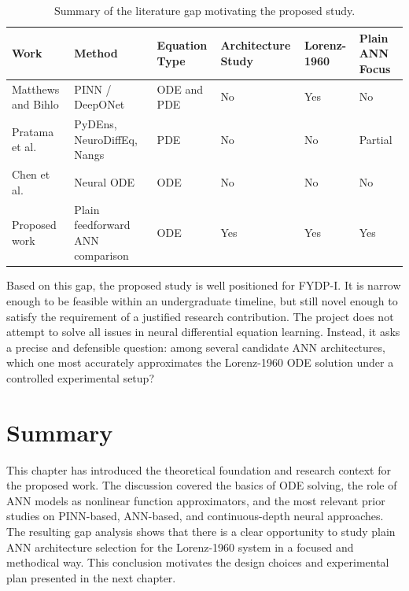 \begin{table}[htbp]
\centering
\caption{Summary of the literature gap motivating the proposed study.}
\begin{tabular}{|p{3.0cm}|p{2.3cm}|p{1.6cm}|p{1.9cm}|p{1.7cm}|p{1.7cm}|}
\hline
\textbf{Work} & \textbf{Method} & \textbf{Equation Type} & \textbf{Architecture Study} & \textbf{Lorenz-1960} & \textbf{Plain ANN Focus} \\
\hline
Matthews and Bihlo \cite{matthews2025pinnde} & PINN / DeepONet & ODE and PDE & No & Yes & No \\
\hline
Pratama et al. \cite{pratama2022ann} & PyDEns, NeuroDiffEq, Nangs & PDE & No & No & Partial \\
\hline
Chen et al. \cite{chen2019neural} & Neural ODE & ODE & No & No & No \\
\hline
Proposed work & Plain feedforward ANN comparison & ODE & Yes & Yes & Yes \\
\hline
\end{tabular}
\end{table}

Based on this gap, the proposed study is well positioned for FYDP-I. It is narrow enough to be feasible within an undergraduate timeline, but still novel enough to satisfy the requirement of a justified research contribution. The project does not attempt to solve all issues in neural differential equation learning. Instead, it asks a precise and defensible question: among several candidate ANN architectures, which one most accurately approximates the Lorenz-1960 ODE solution under a controlled experimental setup?

\section{Summary}
This chapter has introduced the theoretical foundation and research context for the proposed work. The discussion covered the basics of ODE solving, the role of ANN models as nonlinear function approximators, and the most relevant prior studies on PINN-based, ANN-based, and continuous-depth neural approaches. The resulting gap analysis shows that there is a clear opportunity to study plain ANN architecture selection for the Lorenz-1960 system in a focused and methodical way. This conclusion motivates the design choices and experimental plan presented in the next chapter.
